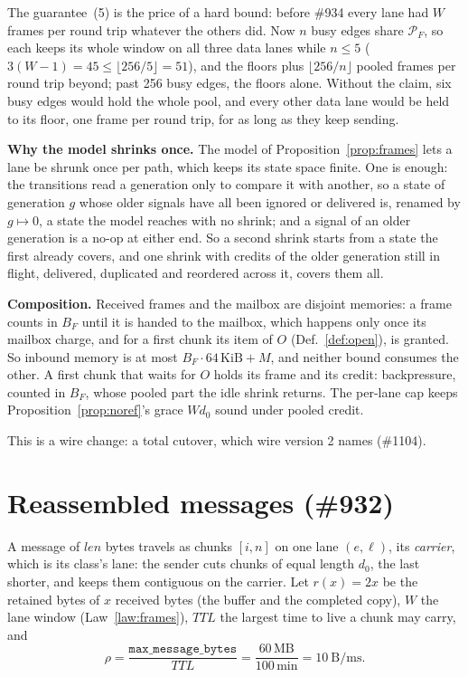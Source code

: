 \documentclass[journal]{IEEEtran}
\newcommand{\Pool}{\mathcal{P}}
\newcommand{\issue}[1]{\#{#1}}
\begin{document}
The guarantee~(5) is the price of a hard bound: before \issue{934} every lane had $W$ frames
per round trip whatever the others did.  Now $n$ busy edges share $\Pool_F$, so each keeps its
whole window on all three data lanes while $n\le5$ ($3(W-1)=45\le\lfloor256/5\rfloor=51$), and
the floors plus $\lfloor256/n\rfloor$ pooled frames per round trip beyond; past 256 busy edges,
the floors alone.  Without the
claim, six busy edges would hold the whole pool, and every other data lane would be held to its
floor, one frame per round trip, for as long as they keep sending.

\textbf{Why the model shrinks once.}  The model of Proposition~\ref{prop:frames} lets a lane be
shrunk once per path, which keeps its state space finite.  One is enough: the transitions read
a generation only to compare it with another, so a state of generation $g$ whose older
signals have all been ignored or delivered is, renamed by $g\mapsto0$, a state the model
reaches with no shrink; and a signal of an older generation is a no-op at either end.  So a
second shrink starts from a state the first already covers, and one shrink with credits of the
older generation still in flight, delivered, duplicated and reordered across it, covers them
all.

\textbf{Composition.}  Received frames and the mailbox are disjoint memories: a frame counts in
$B_F$ until it is handed to the mailbox, which happens only once its mailbox charge, and for a
first chunk its item of $O$ (Def.~\ref{def:open}), is granted.  So inbound memory is at most
$B_F\cdot64\,\mathrm{KiB}+M$, and neither bound consumes the other.  A first chunk that waits
for $O$ holds its frame and its credit: backpressure, counted in $B_F$, whose pooled part the
idle shrink returns.  The per-lane cap keeps Proposition~\ref{prop:noref}'s grace $Wd_0$ sound
under pooled credit.

This is a wire change: a total cutover, which wire version 2 names (\issue{1104}).

\section{Reassembled messages (\issue{932})}\label{sec:reassembly}

A message of $\mathit{len}$ bytes travels as chunks $[i,n]$ on one lane $(e,\ell)$, its
\emph{carrier}, which is its class's lane: the sender cuts chunks of equal length $d_0$, the
last shorter, and keeps them contiguous on the carrier.  Let $r(x)=2x$ be the retained bytes of
$x$ received bytes (the buffer and the completed copy), $W$ the lane window
(Law~\ref{law:frames}), $\mathit{TTL}$ the largest time to live a chunk may carry, and
\[
\rho=\frac{\texttt{max\_message\_bytes}}{\mathit{TTL}}
=\frac{60\,\mathrm{MB}}{100\,\mathrm{min}}=10\ \mathrm{B/ms}.
\]
\end{document}
